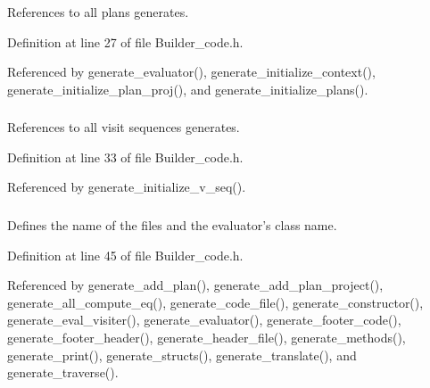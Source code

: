 References to all plans generates. 



Definition at line 27 of file Builder\_\-code.h.



Referenced by generate\_\-evaluator(), generate\_\-initialize\_\-context(), generate\_\-initialize\_\-plan\_\-proj(), and generate\_\-initialize\_\-plans().

\hypertarget{classgenevalmag_1_1Builder__code_a4440af64f703eb71fd4df162f39fdcc6}{
\subsubsection[{b\_\-v\_\-seq}]{}}
\label{classgenevalmag_1_1Builder__code_a4440af64f703eb71fd4df162f39fdcc6}


References to all visit sequences generates. 



Definition at line 33 of file Builder\_\-code.h.



Referenced by generate\_\-initialize\_\-v\_\-seq().

\hypertarget{classgenevalmag_1_1Builder__code_aba028c9ecb9918cd3371b2838b70a639}{
\subsubsection[{file\_\-name}]{}}
\label{classgenevalmag_1_1Builder__code_aba028c9ecb9918cd3371b2838b70a639}


Defines the name of the files and the evaluator's class name. 



Definition at line 45 of file Builder\_\-code.h.



Referenced by generate\_\-add\_\-plan(), generate\_\-add\_\-plan\_\-project(), generate\_\-all\_\-compute\_\-eq(), generate\_\-code\_\-file(), generate\_\-constructor(), generate\_\-eval\_\-visiter(), generate\_\-evaluator(), generate\_\-footer\_\-code(), generate\_\-footer\_\-header(), generate\_\-header\_\-file(), generate\_\-methods(), generate\_\-print(), generate\_\-structs(), generate\_\-translate(), and generate\_\-traverse().

